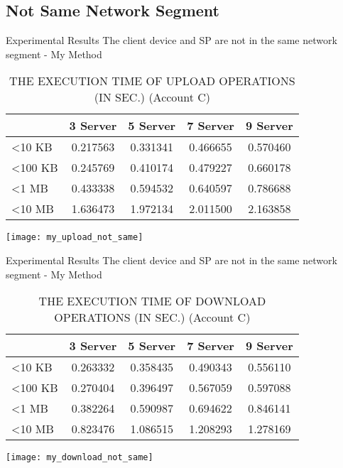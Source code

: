 \subsection{Not Same Network Segment}
\begin{frame}{Experimental Results}
{The client device and SP are \alert{not} in the same network segment - My Method}
	\scriptsize
    \begin{table}[]
    \centering
    \caption{THE EXECUTION TIME OF \alert{UPLOAD} OPERATIONS (IN SEC.) (Account C)}
    \begin{tabular}{lcccc}
                         & 3 Server & 5 Server & 7 Server & 9 Server \\ \hline
        \textless 10 KB  & 0.217563 & 0.331341 & 0.466655 & 0.570460 \\ \hline
        \textless 100 KB & 0.245769 & 0.410174 & 0.479227 & 0.660178 \\ \hline
        \textless 1 MB   & 0.433338 & 0.594532 & 0.640597 & 0.786688 \\ \hline
        \textless 10 MB  & 1.636473 & 1.972134 & 2.011500 & 2.163858 \\ \hline
    \end{tabular}
    \end{table}
    \begin{center}
		\texttt{[image: my\_upload\_not\_same]}
    \end{center}
\end{frame}

\begin{frame}{Experimental Results}
{The client device and SP are \alert{not} in the same network segment - My Method}
	\scriptsize
    \begin{table}[]
    \centering
    \caption{THE EXECUTION TIME OF \alert{DOWNLOAD} OPERATIONS (IN SEC.) (Account C)}
    \begin{tabular}{lcccc}
                         & 3 Server & 5 Server & 7 Server & 9 Server \\ \hline
        \textless 10 KB  & 0.263332 & 0.358435 & 0.490343 & 0.556110 \\ \hline
        \textless 100 KB & 0.270404 & 0.396497 & 0.567059 & 0.597088 \\ \hline
        \textless 1 MB   & 0.382264 & 0.590987 & 0.694622 & 0.846141 \\ \hline
        \textless 10 MB  & 0.823476 & 1.086515 & 1.208293 & 1.278169 \\ \hline
    \end{tabular}
    \end{table}
    \begin{center}
		\texttt{[image: my\_download\_not\_same]}
    \end{center}
\end{frame}

